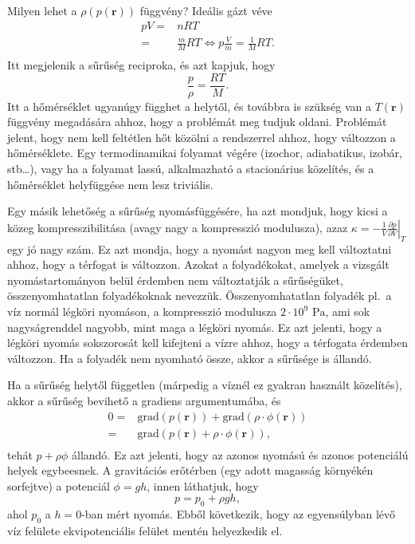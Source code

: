 \documentclass[12pt,a4paper]{scrartcl}
\let\mathbf\bm
\begin{document}
\footnotesize
Milyen lehet a $\rho \left( {p\left( {\mathbf{r}} \right)} \right)$ függvény? Ideális gázt véve
\[\begin{aligned}
  pV =  & nRT \\ 
   =  & \frac{m}{M}RT \Leftrightarrow p\frac{V}{m} = \frac{1}{M}RT. \\ 
\end{aligned} \]
Itt megjelenik a sűrűség reciproka, és azt kapjuk, hogy
\[\frac{p}{\rho } = \frac{{RT}}{M}.\]
Itt a hőmérséklet ugyanúgy függhet a helytől, és továbbra is szükség van a $T\left( {\mathbf{r}} \right)$ függvény megadására ahhoz, hogy a problémát meg tudjuk oldani. Problémát jelent, hogy nem kell feltétlen hőt közölni a rendszerrel ahhoz, hogy változzon a hőmérséklete. Egy termodinamikai folyamat végére (izochor, adiabatikus, izobár, stb\ldots), vagy ha a folyamat lassú, alkalmazható a stacionárius közelítés, és a hőmérséklet helyfüggése nem lesz triviális.

Egy másik lehetőség a sűrűség nyomásfüggésére, ha azt mondjuk, hogy kicsi a közeg kompresszibilitása (avagy nagy a kompresszió modulusza), azaz $\kappa  =  - \frac{1}{V}{\left. {\frac{{\partial p}}{{\partial V}}} \right|_T}$ egy jó nagy szám. Ez azt mondja, hogy a nyomást nagyon meg kell változtatni ahhoz, hogy a térfogat is változzon. Azokat a folyadékokat, amelyek a vizsgált nyomástartományon belül érdemben nem változtatják a sűrűségüket, összenyomhatatlan folyadékoknak nevezzük. Összenyomhatatlan folyadék pl.\ a víz normál légköri nyomáson, a kompresszió modulusza $2 \cdot 10^9\text{ Pa}$, ami sok nagyságrenddel nagyobb, mint maga a légköri nyomás. Ez azt jelenti, hogy a légköri nyomás sokszorosát kell kifejteni a vízre ahhoz, hogy a térfogata érdemben változzon. Ha a folyadék nem nyomható össze, akkor a sűrűsége is állandó.
\normalsize

Ha a sűrűség helytől független (márpedig a víznél ez gyakran használt közelítés), akkor a sűrűség bevihető a gradiens argumentumába, és 
\[\begin{aligned}
  0 =  & {\text{grad}}\left( {p\left( {\mathbf{r}} \right)} \right) +   {\text{grad}}\left( {\rho  \cdot \phi \left( {\mathbf{r}} \right)} \right) \\ 
   =  & {\text{grad}}\left( {p\left( {\mathbf{r}} \right) + \rho  \cdot \phi \left( {\mathbf{r}} \right)} \right), \\ 
\end{aligned} \]
tehát $p+\rho\phi$ állandó. Ez azt jelenti, hogy az azonos nyomású és azonos potenciálú helyek egybeesnek. A gravitációs erőtérben (egy adott magasság környékén sorfejtve) a potenciál $\phi = gh$, innen láthatjuk, hogy
\begin{equation}
p=p_{0}+\rho gh,
\end{equation}
ahol $p_{0}$ a $h=0$-ban mért nyomás. Ebből következik, hogy az egyensúlyban lévő víz felülete ekvipotenciális felület mentén helyezkedik el.
\footnotesize
\end{document}
